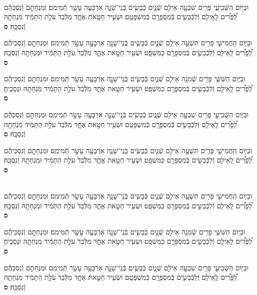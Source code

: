 \documentclass[twoside, openany, parskip=half, 11pt]{book}
\begin{document}
\begin{sometimes}
\begin{footnotesize}
\begin{multicols}{2}
\\
וּבַיּ֧וֹם הַשְּֿׁבִיעִ֛י פָּרִ֥ים שִׁבְעָ֖ה אֵילִ֣ם שְֿׁנָ֑יִם כְּֿבָשִׂ֧ים בְּֿנֵֽי־שָׁנָ֛ה אַרְבָּעָ֥ה עָשָׂ֖ר תְּֿמִימִֽם׃ וּמִנְחָתָ֣ם וְֿנִסְכֵּהֶ֡ם לַ֠פָּרִ֠ים לָֽאֵילִ֧ם וְֿלַכְּֿבָשִׂ֛ים בְּֿמִסְפָּרָ֖ם כְּֿמִשְׁפָּטָֽם׃ וּשְׂעִ֥יר חַטָּ֖את אֶחָ֑ד מִלְּֿבַד֙ עֹלַ֣ת הַתָּמִ֔יד מִנְחָתָ֖הּ וְֿנִסְכָּֽהּ׃ \textbf{ס}

וּבַיּ֧וֹם הַֽחֲמִישִׁ֛י פָּרִ֥ים תִּשְׁעָ֖ה אֵילִ֣ם שְֿׁנָ֑יִם כְּֿבָשִׂ֧ים בְּֿנֵֽי־שָׁנָ֛ה אַרְבָּעָ֥ה עָשָׂ֖ר תְּֿמִימִֽם׃ וּמִנְחָתָ֣ם וְֿנִסְכֵּיהֶ֡ם לַ֠פָּרִ֠ים לָֽאֵילִ֧ם וְֿלַכְּֿבָשִׂ֛ים בְּֿמִסְפָּרָ֖ם כַּמִּשְׁפָּֽט׃ וּשְׂעִ֥יר חַטָּ֖את אֶחָ֑ד מִלְּֿבַד֙ עֹלַ֣ת הַתָּמִ֔יד וּמִנְחָתָ֖הּ וְֿנִסְכָּֽהּ׃ \textbf{ס}

וּבַיּ֧וֹם הַשִּׁשִּׁ֛י פָּרִ֥ים שְֿׁמֹנָ֖ה אֵילִ֣ם שְֿׁנָ֑יִם כְּֿבָשִׂ֧ים בְּֿנֵֽי־שָׁנָ֛ה אַרְבָּעָ֥ה עָשָׂ֖ר תְּֿמִימִֽם׃ וּמִנְחָתָ֣ם וְֿנִסְכֵּיהֶ֡ם לַ֠פָּרִ֠ים לָֽאֵילִ֧ם וְֿלַכְּֿבָשִׂ֛ים בְּֿמִסְפָּרָ֖ם כַּמִּשְׁפָּֽט׃ וּשְׂעִ֥יר חַטָּ֖את אֶחָ֑ד מִלְּֿבַד֙ עֹלַ֣ת הַתָּמִ֔יד מִנְחָתָ֖הּ וּנְסָכֶֽיהָ׃ \textbf{ס}\

וּבַיּ֧וֹם הַשְּֿׁבִיעִ֛י פָּרִ֥ים שִׁבְעָ֖ה אֵילִ֣ם שְֿׁנָ֑יִם כְּֿבָשִׂ֧ים בְּֿנֵֽי־שָׁנָ֛ה אַרְבָּעָ֥ה עָשָׂ֖ר תְּֿמִימִֽם׃ וּמִנְחָתָ֣ם וְֿנִסְכֵּהֶ֡ם לַ֠פָּרִ֠ים לָֽאֵילִ֧ם וְֿלַכְּֿבָשִׂ֛ים בְּֿמִסְפָּרָ֖ם כְּֿמִשְׁפָּטָֽם׃ וּשְׂעִ֥יר חַטָּ֖את אֶחָ֑ד מִלְּֿבַד֙ עֹלַ֣ת הַתָּמִ֔יד מִנְחָתָ֖הּ וְֿנִסְכָּֽהּ׃ \textbf{ס}

וּבַיּ֧וֹם הַֽחֲמִישִׁ֛י פָּרִ֥ים תִּשְׁעָ֖ה אֵילִ֣ם שְֿׁנָ֑יִם כְּֿבָשִׂ֧ים בְּֿנֵֽי־שָׁנָ֛ה אַרְבָּעָ֥ה עָשָׂ֖ר תְּֿמִימִֽם׃ וּמִנְחָתָ֣ם וְֿנִסְכֵּיהֶ֡ם לַ֠פָּרִ֠ים לָֽאֵילִ֧ם וְֿלַכְּֿבָשִׂ֛ים בְּֿמִסְפָּרָ֖ם כַּמִּשְׁפָּֽט׃ וּשְׂעִ֥יר חַטָּ֖את אֶחָ֑ד מִלְּֿבַד֙ עֹלַ֣ת הַתָּמִ֔יד וּמִנְחָתָ֖הּ וְֿנִסְכָּֽהּ׃ \textbf{ס}

\\
וּבַיּ֧וֹם הַֽחֲמִישִׁ֛י פָּרִ֥ים תִּשְׁעָ֖ה אֵילִ֣ם שְֿׁנָ֑יִם כְּֿבָשִׂ֧ים בְּֿנֵֽי־שָׁנָ֛ה אַרְבָּעָ֥ה עָשָׂ֖ר תְּֿמִימִֽם׃ וּמִנְחָתָ֣ם וְֿנִסְכֵּיהֶ֡ם לַ֠פָּרִ֠ים לָֽאֵילִ֧ם וְֿלַכְּֿבָשִׂ֛ים בְּֿמִסְפָּרָ֖ם כַּמִּשְׁפָּֽט׃ וּשְׂעִ֥יר חַטָּ֖את אֶחָ֑ד מִלְּֿבַד֙ עֹלַ֣ת הַתָּמִ֔יד וּמִנְחָתָ֖הּ וְֿנִסְכָּֽהּ׃ \textbf{ס}

וּבַיּ֧וֹם הַשִּׁשִּׁ֛י פָּרִ֥ים שְֿׁמֹנָ֖ה אֵילִ֣ם שְֿׁנָ֑יִם כְּֿבָשִׂ֧ים בְּֿנֵֽי־שָׁנָ֛ה אַרְבָּעָ֥ה עָשָׂ֖ר תְּֿמִימִֽם׃ וּמִנְחָתָ֣ם וְֿנִסְכֵּיהֶ֡ם לַ֠פָּרִ֠ים לָֽאֵילִ֧ם וְֿלַכְּֿבָשִׂ֛ים בְּֿמִסְפָּרָ֖ם כַּמִּשְׁפָּֽט׃ וּשְׂעִ֥יר חַטָּ֖את אֶחָ֑ד מִלְּֿבַד֙ עֹלַ֣ת הַתָּמִ֔יד מִנְחָתָ֖הּ וּנְסָכֶֽיהָ׃ \textbf{ס}

וּבַיּ֧וֹם הַשְּֿׁבִיעִ֛י פָּרִ֥ים שִׁבְעָ֖ה אֵילִ֣ם שְֿׁנָ֑יִם כְּֿבָשִׂ֧ים בְּֿנֵֽי־שָׁנָ֛ה אַרְבָּעָ֥ה עָשָׂ֖ר תְּֿמִימִֽם׃ וּמִנְחָתָ֣ם וְֿנִסְכֵּהֶ֡ם לַ֠פָּרִ֠ים לָֽאֵילִ֧ם וְֿלַכְּֿבָשִׂ֛ים בְּֿמִסְפָּרָ֖ם כְּֿמִשְׁפָּטָֽם׃ וּשְׂעִ֥יר חַטָּ֖את אֶחָ֑ד מִלְּֿבַד֙ עֹלַ֣ת הַתָּמִ֔יד מִנְחָתָ֖הּ וְֿנִסְכָּֽהּ׃ \textbf{ס}


\end{multicols}
\end{footnotesize}
\end{sometimes}
\end{document}
